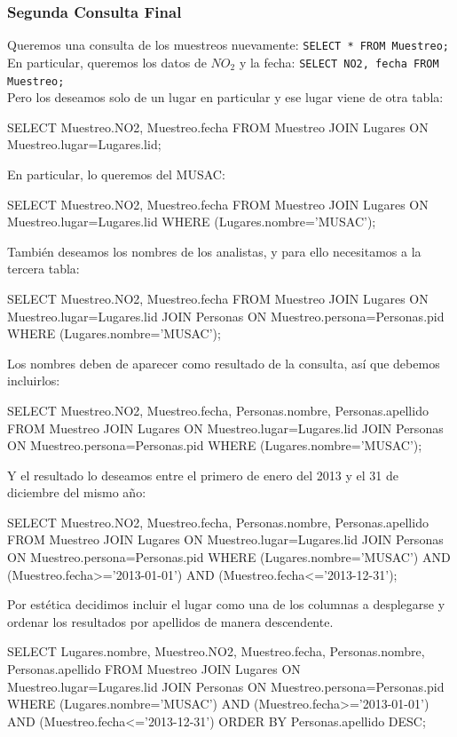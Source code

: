 \documentclass[10pt,letterpaper]{article}
\newcommand{\inlinecode}[1]{
\colorbox{light-gray}{\texttt{#1}}
}
\newenvironment{Code}
{
\begin{lrbox}{\selvestebox}%
\begin{minipage}{\dimexpr\columnwidth-2\fboxsep\relax}
\fontfamily{\ttdefault}\selectfont
}
{\end{minipage}\end{lrbox}%
\begin{center}
\colorbox{light-gray}{\usebox{\selvestebox}}
\end{center}
}
\begin{document}
\subsubsection{Segunda Consulta Final}

\noindent Queremos una consulta de los muestreos nuevamente: \inlinecode{SELECT * FROM Muestreo;}\\
En particular, queremos los datos de $NO_2$ y la fecha: \inlinecode{SELECT NO2, fecha FROM Muestreo;}\\
Pero los deseamos solo de un lugar en particular y ese lugar viene de otra tabla:
\begin{Code}
SELECT Muestreo.NO2, Muestreo.fecha FROM Muestreo JOIN Lugares ON Muestreo.lugar=Lugares.lid;
\end{Code}
En particular, lo queremos del MUSAC:
\begin{Code}
SELECT Muestreo.NO2, Muestreo.fecha FROM Muestreo JOIN Lugares ON Muestreo.lugar=Lugares.lid WHERE (Lugares.nombre='MUSAC');
\end{Code}
Tambi\'en deseamos los nombres de los analistas, y para ello necesitamos a la tercera tabla:
\begin{Code}
SELECT Muestreo.NO2, Muestreo.fecha FROM Muestreo JOIN Lugares ON Muestreo.lugar=Lugares.lid JOIN Personas ON Muestreo.persona=Personas.pid WHERE (Lugares.nombre='MUSAC');
\end{Code}
Los nombres deben de aparecer como resultado de la consulta, as\'i que debemos incluirlos:
\begin{Code}
SELECT Muestreo.NO2, Muestreo.fecha, Personas.nombre, Personas.apellido FROM Muestreo JOIN Lugares ON Muestreo.lugar=Lugares.lid JOIN Personas ON Muestreo.persona=Personas.pid WHERE (Lugares.nombre='MUSAC');
\end{Code}
Y el resultado lo deseamos entre el primero de enero del 2013 y el 31 de diciembre del mismo a\~no:
\begin{Code}
SELECT Muestreo.NO2, Muestreo.fecha, Personas.nombre, Personas.apellido FROM Muestreo JOIN Lugares ON Muestreo.lugar=Lugares.lid JOIN Personas ON Muestreo.persona=Personas.pid WHERE (Lugares.nombre='MUSAC') AND (Muestreo.fecha>='2013-01-01') AND (Muestreo.fecha<='2013-12-31');
\end{Code}
Por est\'etica decidimos incluir el lugar como una de los columnas a desplegarse y ordenar los resultados por apellidos de manera descendente.
\begin{Code}
SELECT Lugares.nombre, Muestreo.NO2, Muestreo.fecha, Personas.nombre, Personas.apellido FROM Muestreo JOIN Lugares ON Muestreo.lugar=Lugares.lid JOIN Personas ON Muestreo.persona=Personas.pid WHERE (Lugares.nombre='MUSAC') AND (Muestreo.fecha>='2013-01-01') AND (Muestreo.fecha<='2013-12-31') ORDER BY Personas.apellido DESC;
\end{Code}
\end{document}
